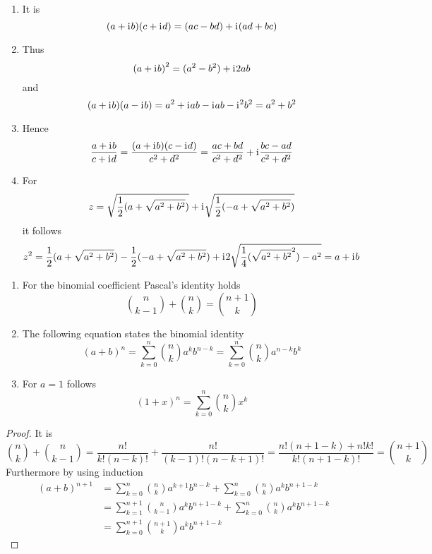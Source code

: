 \begin{lemma}\hfill
    \begin{enumerate}
        \item It is
            \[
                (a + \mathrm{i}\mkern1mu b) (c + \mathrm{i}\mkern1mu d) = (ac - bd) + \mathrm{i}\mkern1mu (ad + bc)
            \]
        \item Thus
            \[
               {(a + \mathrm{i}\mkern1mu b)}^2 = (a^2 - b^2) + \mathrm{i}\mkern1mu 2ab
            \]
            and
            \[
                (a + \mathrm{i}\mkern1mu b) (a - \mathrm{i}\mkern1mu b) =  a^2 + \mathrm{i}\mkern1mu ab - \mathrm{i}\mkern1mu ab - \mathrm{i}\mkern1mu^2b^2 = a^2 + b^2
            \]
        \item Hence
            \[
                \frac{a + \mathrm{i}\mkern1mu b}{c + \mathrm{i}\mkern1mu d} = \frac{(a + \mathrm{i}\mkern1mu b)(c - \mathrm{i}\mkern1mu d)}{c^2 + d^2} = 
                    \frac{ac + bd}{c^2 + d^2} + \mathrm{i}\mkern1mu \frac{bc - ad}{c^2 + d^2}
            \]
        \item For 
            \[
                z = \sqrt{\frac{1}{2}(a + \sqrt{a^2 + b^2})} + \mathrm{i}\mkern1mu \sqrt{\frac{1}{2}(-a + \sqrt{a^2 + b^2})} 
            \]
            it follows
            \[
                z^2 = \frac{1}{2}(a + \sqrt{a^2 + b^2}) - \frac{1}{2}(-a + \sqrt{a^2 + b^2}) +
                    \mathrm{i}\mkern1mu 2\sqrt{\frac{1}{4} (\sqrt{a^2 + b^2}^2) - a^2} = a + \mathrm{i}\mkern1mu b
            \]
    \end{enumerate}
\end{lemma}
\bigskip


\begin{lemma}\hfill
    \begin{enumerate}
        \item For the binomial coefficient Pascal's identity holds
			\[
				\binom{n}{k - 1} + \binom{n}{k} = \binom{n + 1 }{k }   
			\]  
        \item The following equation states the binomial identity
			\[
				{(a + b)}^n = \sum_{k=0}^{n} \binom{n}{k} a^{k} b^{n - k} = \sum_{k=0}^{n} \binom{n}{k} a^{n -k} b^{k}
			\]  
        \item For \( a = 1 \) follows
			\[
				{(1 + x)}^n = \sum_{k=0}^{n} \binom{n}{k} x^{k}
			\]  
    \end{enumerate}
\end{lemma}

\begin{proof}
It is
\[
	\binom{n}{k} + \binom{n}{k - 1} = \frac{n!}{k!(n - k)!} + \frac{n!}{(k - 1)!(n - k + 1)!}
		= \frac{n!(n + 1 - k) + n!k!}{k!(n + 1- k)!} = \binom{n + 1}{k}
\]
Furthermore by using induction
\[
    \begin{split}
		{(a + b)}^{n + 1}	& = \sum_{k=0}^{n} \binom{n}{k} a^{k + 1} b^{n - k} + 
								\sum_{k=0}^{n} \binom{n}{k} a^{k} b^{n + 1 - k} \\
							& = \sum_{k=1}^{n + 1} \binom{n}{k - 1} a^{k} b^{n + 1 - k} + 
								\sum_{k=0}^{n} \binom{n}{k} a^{k} b^{n + 1 - k} \\
							& = \sum_{k=0}^{n + 1} \binom{n + 1}{k} a^{k} b^{n + 1 - k}
    \end{split}
\]  
\end{proof}
\bigskip


